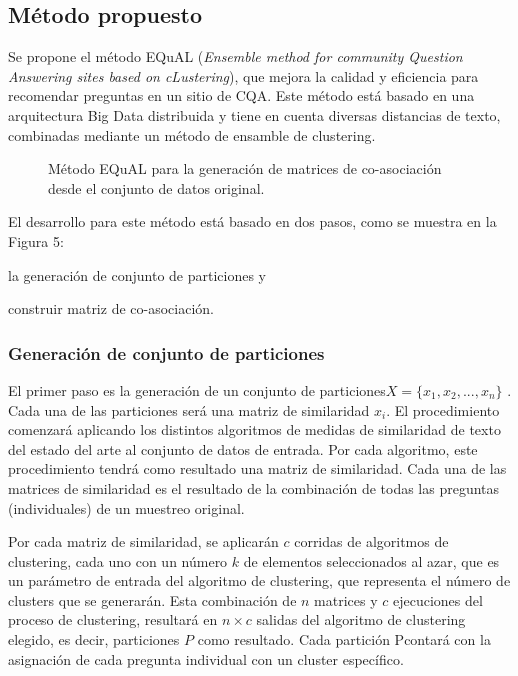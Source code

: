 \subsection{Método propuesto}
Se propone el método EQuAL (\textit{Ensemble method for community Question Answering sites based on cLustering}), que mejora la calidad y eficiencia para recomendar preguntas en un sitio de CQA. Este método está basado en una arquitectura Big Data distribuida y tiene en cuenta diversas distancias de texto, combinadas mediante un método de ensamble de clustering.
\begin{figure}
	\def\svgwidth{\linewidth}
	
	\caption{Método EQuAL para la generación de matrices de co-asociación desde el conjunto de datos original.}
\end{figure}

El desarrollo para este método está basado en dos pasos, como se muestra en la Figura 5: \begin{enumerate*} [label=(\roman*)] \item la generación de conjunto de particiones y \item construir matriz de co-asociación. \end{enumerate*}

\subsubsection{Generación de conjunto de particiones}
El primer paso es la generación de un conjunto de particiones\(X = \{x_1, x_2,... , x_n\}\) . Cada una de las particiones será una matriz de similaridad \(x_i\). El procedimiento comenzará aplicando los distintos algoritmos de medidas de similaridad de texto del estado del arte al conjunto de datos de entrada. Por cada algoritmo, este procedimiento tendrá como resultado una matriz de similaridad. Cada una de las matrices de similaridad es el resultado de la combinación de todas las preguntas (individuales) de un muestreo original.

\bigskip Por cada matriz de similaridad, se aplicarán \(c\) corridas de algoritmos de clustering, cada uno con un número \(k\) de elementos seleccionados al azar, que es un parámetro de entrada del algoritmo de clustering, que representa el número de clusters que se generarán. Esta combinación de \(n\) matrices y \(c\) ejecuciones del proceso de clustering, resultará en \(n \times c\) salidas del algoritmo de clustering elegido, es decir, particiones \(P\) como resultado. Cada partición Pcontará con la asignación de cada pregunta individual con un cluster específico.

